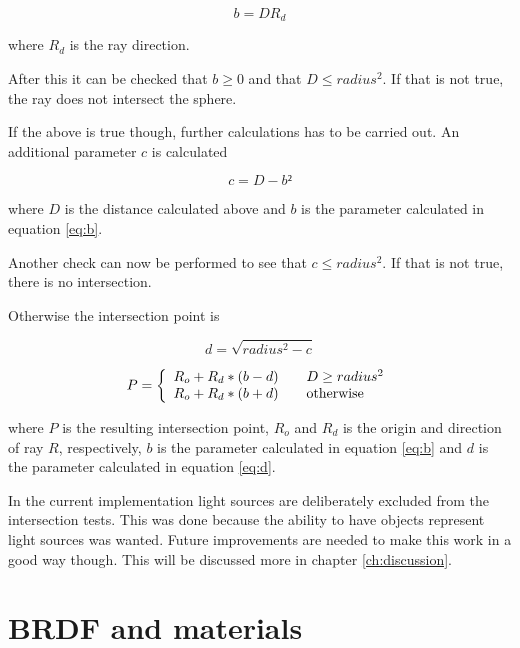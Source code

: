 \documentclass[a4paper]{report}
\begin{document}
\begin{equation}
 b = D R_d
 \label{eq:b}
\end{equation}

where \(R_d\) is the ray direction.

After this it can be checked that \(b \geq 0\) and that \(D \leq
radius^2\). If that is not true, the ray does not intersect the
sphere.

If the above is true though, further calculations has to be carried
out. An additional parameter \(c\) is calculated

\begin{equation}
  c = D - b²
\end{equation}

where \(D\) is the distance calculated above and \(b\) is the
parameter calculated in equation \ref{eq:b}.

Another check can now be performed to see that \(c \leq radius^2\). If
that is not true, there is no intersection.

Otherwise the intersection point is

\begin{equation}
  d = \sqrt{radius^2 - c}
  \label{eq:d}
\end{equation}

\begin{equation}
  P = \left \{ 
  \begin{array}{l l}
    R_o + R_d *(b-d) & \quad D \geq radius^2 \\
    R_o + R_d *(b+d) & \quad \text{otherwise} \\
  \end{array} \right.
\end{equation}

where \(P\) is the resulting intersection point, \(R_o\) and \(R_d\)
is the origin and direction of ray \(R\), respectively, \(b\) is the
parameter calculated in equation \ref{eq:b} and \(d\) is the parameter
calculated in equation \ref{eq:d}.

In the current implementation light sources are deliberately excluded
from the intersection tests. This was done because the ability to have
objects represent light sources was wanted. Future improvements are
needed to make this work in a good way though. This will be discussed more in
chapter \ref{ch:discussion}.

\section{BRDF and materials}
\end{document}
